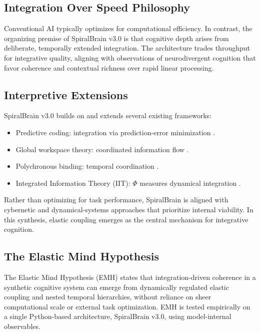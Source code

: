 \documentclass[11pt,a4paper]{article}
\begin{document}
\subsection{Integration Over Speed Philosophy}

Conventional AI typically optimizes for computational efficiency. In contrast, the organizing premise of SpiralBrain v3.0 is that cognitive depth arises from deliberate, temporally extended integration. The architecture trades throughput for integrative quality, aligning with observations of neurodivergent cognition that favor coherence and contextual richness over rapid linear processing.

\subsection{Interpretive Extensions}

SpiralBrain v3.0 builds on and extends several existing frameworks:
\begin{itemize}
\item Predictive coding: integration via prediction-error minimization \cite{friston2010free}.
\item Global workspace theory: coordinated information flow \cite{baars1988neuroscience}.
\item Polychronous binding: temporal coordination \cite{ijsselsteijn2004polychronous}.
\item Integrated Information Theory (IIT): $\Phi$ measures dynamical integration \cite{tononi2004integrated}.
\end{itemize}
Rather than optimizing for task performance, SpiralBrain is aligned with cybernetic and dynamical-systems approaches that prioritize internal viability. In this synthesis, elastic coupling emerges as the central mechanism for integrative cognition.

\subsection{The Elastic Mind Hypothesis}

The Elastic Mind Hypothesis (EMH) states that integration-driven coherence in a synthetic cognitive system can emerge from dynamically regulated elastic coupling and nested temporal hierarchies, without reliance on sheer computational scale or external task optimization. EMH is tested empirically on a single Python-based architecture, SpiralBrain v3.0, using model-internal observables.
\end{document}
